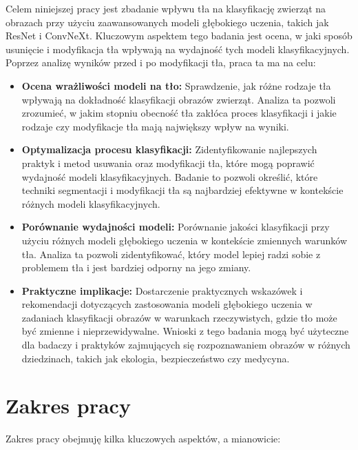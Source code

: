 Celem niniejszej pracy jest zbadanie wpływu tła na klasyfikację zwierząt na obrazach przy 
użyciu zaawansowanych modeli głębokiego uczenia, takich jak ResNet i ConvNeXt. Kluczowym aspektem 
tego badania jest ocena, w jaki sposób usunięcie i modyfikacja tła wpływają na wydajność tych modeli 
klasyfikacyjnych. Poprzez analizę wyników przed i po modyfikacji tła, praca ta ma na celu:

\begin{itemize}
    \item \textbf{Ocena wrażliwości modeli na tło:} Sprawdzenie, jak różne rodzaje tła wpływają na 
    dokładność klasyfikacji obrazów zwierząt. Analiza ta pozwoli zrozumieć, w jakim stopniu obecność 
    tła zakłóca proces klasyfikacji i jakie rodzaje czy modyfikacje tła mają największy wpływ na wyniki.
    \item \textbf{Optymalizacja procesu klasyfikacji:} Zidentyfikowanie najlepszych praktyk i metod 
    usuwania oraz modyfikacji tła, które mogą poprawić wydajność modeli klasyfikacyjnych. Badanie to 
    pozwoli określić, które techniki segmentacji i modyfikacji tła są najbardziej efektywne w 
    kontekście różnych modeli klasyfikacyjnych.
    \item \textbf{Porównanie wydajności modeli:} Porównanie jakości klasyfikacji przy użyciu różnych 
    modeli głębokiego uczenia w kontekście zmiennych warunków tła. Analiza ta pozwoli zidentyfikować, 
    który model lepiej radzi sobie z problemem tła i jest bardziej odporny na jego zmiany.
    \item \textbf{Praktyczne implikacje:} Dostarczenie praktycznych wskazówek i rekomendacji 
    dotyczących zastosowania modeli głębokiego uczenia w zadaniach klasyfikacji obrazów w warunkach 
    rzeczywistych, gdzie tło może być zmienne i nieprzewidywalne. Wnioski z tego badania mogą być 
    użyteczne dla badaczy i praktyków zajmujących się rozpoznawaniem obrazów w różnych dziedzinach, 
    takich jak ekologia, bezpieczeństwo czy medycyna.
\end{itemize}

\section*{Zakres pracy}

Zakres pracy obejmuję kilka kluczowych aspektów, a mianowicie:

